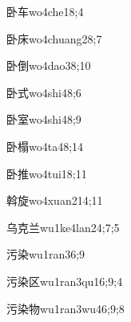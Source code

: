 \begin{verbete}{卧车}{wo4che1}{8;4}
\end{verbete}

\begin{verbete}{卧床}{wo4chuang2}{8;7}
\end{verbete}

\begin{verbete}{卧倒}{wo4dao3}{8;10}
\end{verbete}

\begin{verbete}{卧式}{wo4shi4}{8;6}
\end{verbete}

\begin{verbete}{卧室}{wo4shi4}{8;9}
\end{verbete}

\begin{verbete}{卧榻}{wo4ta4}{8;14}
\end{verbete}

\begin{verbete}{卧推}{wo4tui1}{8;11}
\end{verbete}

\begin{verbete}{斡旋}{wo4xuan2}{14;11}
\end{verbete}

\begin{verbete}{乌克兰}{wu1ke4lan2}{4;7;5}
\end{verbete}

\begin{verbete}{污染}{wu1ran3}{6;9}
\end{verbete}

\begin{verbete}{污染区}{wu1ran3qu1}{6;9;4}
\end{verbete}

\begin{verbete}{污染物}{wu1ran3wu4}{6;9;8}
\end{verbete}

